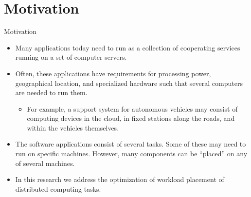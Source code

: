 \documentclass[pdf]{beamer}
\theoremstyle{definition}
\begin{document}
\section{Motivation}
\begin{frame}{Motivation}
    \begin{itemize}
        \item Many applications today need to run as a collection of cooperating services
        running on a set of computer servers.
        \item Often,
        these applications have requirements for processing power,
        geographical location,
        and specialized hardware
        such that several computers are needed to run them.
        \begin{itemize}
            \item For example,
            a support system for autonomous vehicles may consist of computing devices
            in the cloud,
            in fixed stations along the roads,
            and within the vehicles themselves.
        \end{itemize}

        \item The software applications consist of several tasks.
        Some of these may need to run on specific machines.
        However,
        many components can be ``placed'' on any of several machines.
        \item In this research we address the optimization of workload placement of distributed computing tasks.
    \end{itemize}
\end{frame}
\end{document}
